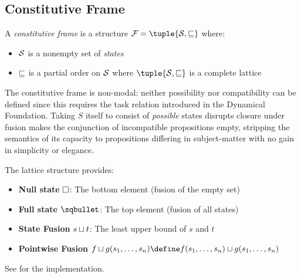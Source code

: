 \documentclass[../LogosReference.tex]{subfiles}
\begin{document}
\subsection{Constitutive Frame}\label{sec:constitutive-frame}

\begin{definition}\label{def:constitutive-frame}
	A \emph{constitutive frame} is a structure $\mframe = \tuple{\statespace, \parthood}$ where:
	\begin{itemize}
		\item $\mathcal{S}$ is a nonempty set of \emph{states}
		\item $\sqsubseteq$ is a partial order on $\mathcal{S}$ where $\tuple{\statespace, \parthood}$ is a complete lattice
	\end{itemize}
\end{definition}

\begin{remark}
	The constitutive frame is non-modal: neither possibility nor compatibility can be defined since this requires the task relation introduced in the Dynamical Foundation.
	Taking $S$ itself to consist of \textit{possible} states disrupts closure under fusion makes the conjunction of incompatible propositions empty, stripping the semantics of its capacity to propositions differing in subject-matter with no gain in simplicity or elegance.
\end{remark}

\begin{remark}
	The lattice structure provides:
	\begin{itemize}
		\item \textbf{Null state} $\square$: The bottom element (fusion of the empty set)
		\item \textbf{Full state} $\fullstate$: The top element (fusion of all states)
		\item \textbf{State Fusion} $s\sqcup t$: The least upper bound of $s$ and $t$
		\item \textbf{Pointwise Fusion} $\fusion{f}{g}(s_1,\ldots,s_n) \define \fusion{f(s_1,\ldots,s_n)}{g(s_1,\ldots,s_n)}$ 
	\end{itemize}
	See  for the implementation.
\end{remark}


\end{document}
